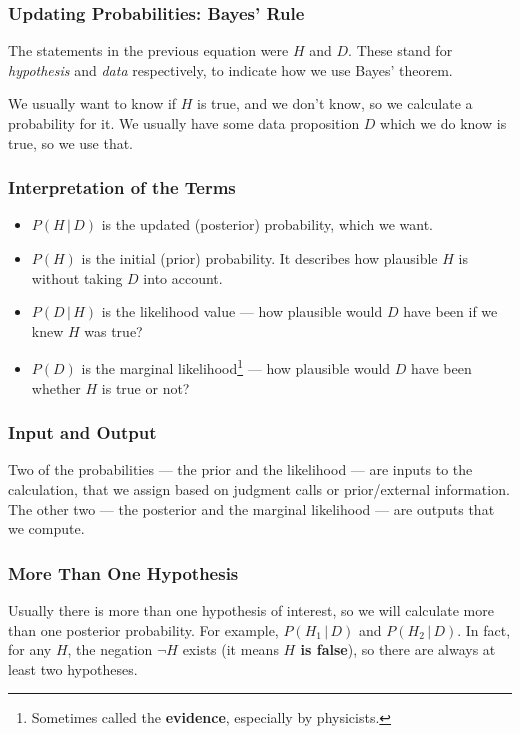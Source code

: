 \documentclass{beamer}
\newcommand{\given}{\,|\,}
\begin{document}
\begin{frame}
\frametitle{Updating Probabilities: Bayes' Rule}
The statements in the previous equation were $H$ and $D$.
These stand for {\em hypothesis} and {\em data} respectively,
to indicate how we use Bayes' theorem.\\[0.5em]\pause

We usually want to know if $H$ is true, and we don't know,
so we calculate a probability for it. We usually have some
data proposition $D$ which we do know is true, so we use that.

\end{frame}


\begin{frame}
\frametitle{Interpretation of the Terms}

\begin{itemize}
\item $P(H\given D)$ is the updated (posterior) probability, which we
want.\pause
\item $P(H)$ is the initial (prior) probability. It describes
how plausible $H$ is without taking $D$ into account.\pause
\item $P(D \given H)$ is the likelihood value --- how plausible would $D$
have been if we knew $H$ was true?\pause
\item $P(D)$ is the marginal likelihood\footnote{Sometimes called the
{\bf evidence}, especially by physicists.} --- how plausible would $D$ have been
whether $H$ is true or not?
\end{itemize}

\end{frame}


\begin{frame}
\frametitle{Input and Output}
Two of the probabilities --- the prior and the likelihood --- are inputs to
the calculation, that we assign based on judgment calls or prior/external
information.\\

The other two --- the posterior and the marginal likelihood --- are outputs
that we compute.
\end{frame}


\begin{frame}
\frametitle{More Than One Hypothesis}
Usually there is more than one hypothesis of interest, so we will calculate
more than one posterior probability. For example, $P(H_1 \given D)$ and
$P(H_2 \given D)$. In fact, for any $H$, the negation $\neg H$ exists
(it means {\bf $H$ is false}), so there are always at least two hypotheses.


\end{frame}
\end{document}
